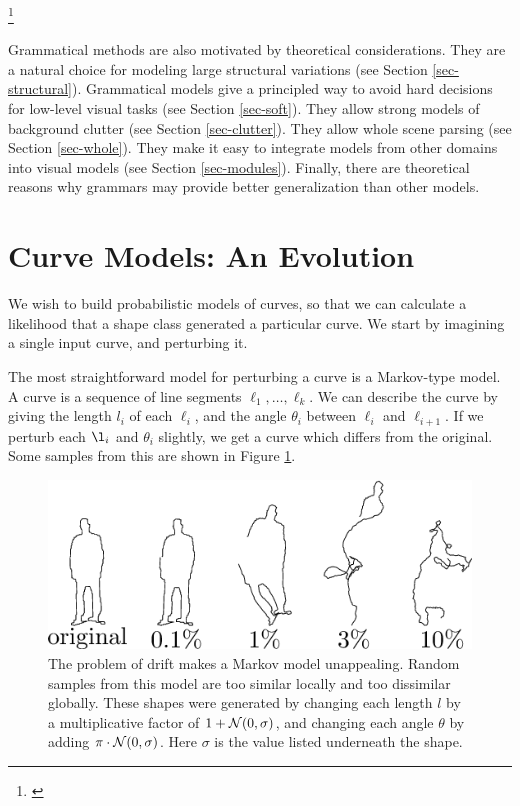 \footnote{ \cite{bsd}}

Grammatical methods are also motivated by theoretical
considerations. They are a natural choice for modeling large
structural variations (see Section \ref{sec-structural}). Grammatical
models give a principled way to avoid hard decisions for low-level
visual tasks (see Section \ref{sec-soft}). They allow strong models of
background clutter (see Section \ref{sec-clutter}). They allow whole
scene parsing (see Section \ref{sec-whole}). They make it easy to
integrate models from other domains into visual models (see Section
\ref{sec-modules}). Finally, there are theoretical reasons why
grammars may provide better generalization than other models.

\section{Curve Models: An Evolution}

We wish to build probabilistic models of curves, so that we can
calculate a likelihood that a shape class generated a particular
curve. We start by imagining a single input curve, and perturbing it.

The most straightforward model for perturbing a curve is a Markov-type
model. A curve is a sequence of line segments
$\ell_1,\dots,\ell_k$. We can describe the curve by giving the length
$l_i$ of each $\ell_i$, and the angle $\theta_i$ between $\ell_i$ and
$\ell_{i+1}$. If we perturb each $\l_i$ and $\theta_i$ slightly, we
get a curve which differs from the original. Some samples from this
are shown in Figure \ref{fig-markov}.
\begin{figure}
  \centering
\includegraphics[width=120mm]{images/markov_new.png}
\caption{The problem of drift makes a Markov model unappealing. Random
  samples from this model are too similar locally and too dissimilar
  globally. These shapes were generated by changing each length $l$ by
  a multiplicative factor of $1 + {\mathcal N}(0,\sigma)$, and changing each
  angle $\theta$ by adding $\pi \cdot {\mathcal N}(0,\sigma )$. Here $\sigma$
  is the value listed underneath the shape.}
\label{fig-markov}
\end{figure}

